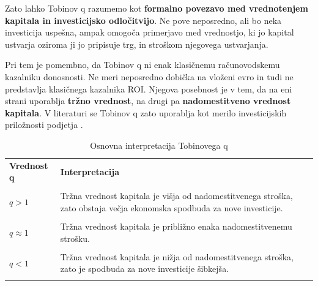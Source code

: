 \documentclass[12pt,a4paper]{article}
\begin{document}
Zato lahko Tobinov q razumemo kot \textbf{formalno povezavo med vrednotenjem kapitala in investicijsko odločitvijo}. Ne pove neposredno, ali bo neka investicija uspešna, ampak omogoča primerjavo med vrednostjo, ki jo kapital ustvarja oziroma ji jo pripisuje trg, in stroškom njegovega ustvarjanja.



Pri tem je pomembno, da Tobinov q ni enak klasičnemu računovodskemu kazalniku donosnosti. Ne meri neposredno dobička na vloženi evro in tudi ne predstavlja klasičnega kazalnika ROI. Njegova posebnost je v tem, da na eni strani uporablja \textbf{tržno vrednost}, na drugi pa \textbf{nadomestitveno vrednost kapitala}. V literaturi se Tobinov q zato uporablja kot merilo investicijskih priložnosti podjetja \citep{PetersTaylor2016}.



\begin{table}[htbp]

\centering

\caption{Osnovna interpretacija Tobinovega q}

\label{tab:interpretacija_q}

\begin{tabular}{p{3cm}p{10cm}}

\toprule

\textbf{Vrednost q} & \textbf{Interpretacija} \\\\

\midrule

$q>1$ &

Tržna vrednost kapitala je višja od nadomestitvenega stroška, zato obstaja večja ekonomska spodbuda za nove investicije. \\\\



$q\approx1$ &

Tržna vrednost kapitala je približno enaka nadomestitvenemu strošku. \\\\



$q<1$ &

Tržna vrednost kapitala je nižja od nadomestitvenega stroška, zato je spodbuda za nove investicije šibkejša. \\\\

\bottomrule

\end{tabular}

\end{table}
\end{document}
